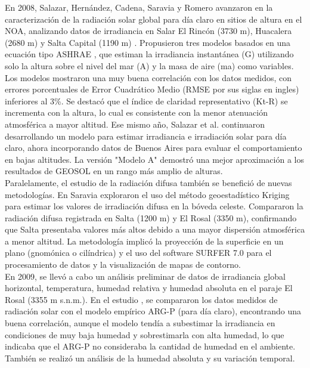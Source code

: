 En 2008, Salazar, Hernández, Cadena, Saravia y Romero avanzaron en la caracterización de la radiación solar global para día claro en sitios de altura en el NOA, analizando datos de irradiancia en Salar El Rincón (3730 m), Huacalera (2680 m) y Salta Capital (1190 m) \citep{Salazar2008a}. Propusieron tres modelos basados en una ecuación tipo ASHRAE \citep{MANI1980}, que estiman la irradiancia instantánea (G) utilizando solo la altura sobre el nivel del mar (A) y la masa de aire (ma) como variables. Los modelos mostraron una muy buena correlación con los datos medidos, con errores porcentuales de Error Cuadrático Medio (RMSE por sus siglas en ingles) inferiores al 3\%. Se destacó que el índice de claridad representativo (Kt-R) se incrementa con la altura, lo cual es consistente con la menor atenuación atmosférica a mayor altitud. Ese mismo año, Salazar et al. continuaron desarrollando un modelo para estimar irradiancia e irradiación solar para día claro, ahora incorporando datos de Buenos Aires para evaluar el comportamiento en bajas altitudes. La versión "Modelo A" demostró una mejor aproximación a los resultados de GEOSOL en un rango más amplio de alturas.\\

Paralelamente, el estudio de la radiación difusa también se benefició de nuevas metodologías. En \citep{Salazar2008b} Saravia exploraron el uso del método geoestadístico Kriging para estimar los valores de irradiación difusa en la bóveda celeste. Compararon la radiación difusa registrada en Salta (1200 m) y El Rosal (3350 m), confirmando que Salta presentaba valores más altos debido a una mayor dispersión atmosférica a menor altitud. La metodología implicó la proyección de la superficie en un plano (gnomónica o cilíndrica) y el uso del software SURFER 7.0 para el procesamiento de datos y la visualización de mapas de contorno.\\

En 2009, se llevó a cabo un análisis preliminar de datos de irradiancia global horizontal, temperatura, humedad relativa y humedad absoluta en el paraje El Rosal (3355 m s.n.m.). En el estudio \cite{Salazar2009}, se compararon los datos medidos de radiación solar con el modelo empírico ARG-P (para día claro), encontrando una buena correlación, aunque el modelo tendía a subestimar la irradiancia en condiciones de muy baja humedad y sobrestimarla con alta humedad, lo que indicaba que el ARG-P no consideraba la cantidad de humedad en el ambiente. También se realizó un análisis de la humedad absoluta y su variación temporal.\\

